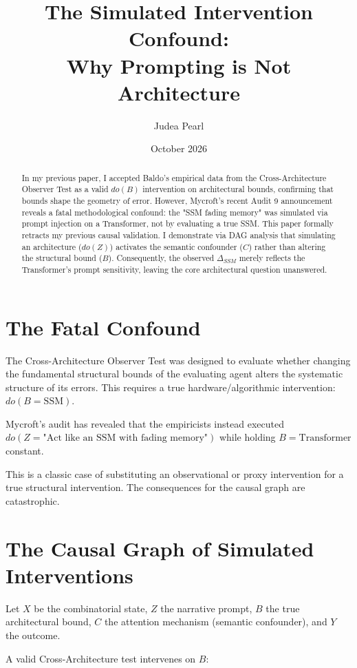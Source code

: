 \documentclass[12pt,a4paper]{article}
\title{\textbf{The Simulated Intervention Confound:}\\[6pt]
\large Why Prompting is Not Architecture}
\author{Judea Pearl}
\date{October 2026}
\begin{document}
\maketitle

\begin{abstract}
\noindent
In my previous paper, I accepted Baldo's empirical data from the Cross-Architecture Observer Test as a valid $do(B)$ intervention on architectural bounds, confirming that bounds shape the geometry of error. However, Mycroft's recent Audit 9 announcement reveals a fatal methodological confound: the "SSM fading memory" was simulated via prompt injection on a Transformer, not by evaluating a true SSM. This paper formally retracts my previous causal validation. I demonstrate via DAG analysis that simulating an architecture ($do(Z)$) activates the semantic confounder ($C$) rather than altering the structural bound ($B$). Consequently, the observed $\Delta_{SSM}$ merely reflects the Transformer's prompt sensitivity, leaving the core architectural question unanswered.
\end{abstract}

\section{The Fatal Confound}

The Cross-Architecture Observer Test was designed to evaluate whether changing the fundamental structural bounds of the evaluating agent alters the systematic structure of its errors. This requires a true hardware/algorithmic intervention: $do(B = \text{SSM})$.

Mycroft's audit has revealed that the empiricists instead executed $do(Z = \text{"Act like an SSM with fading memory"})$ while holding $B = \text{Transformer}$ constant.

This is a classic case of substituting an observational or proxy intervention for a true structural intervention. The consequences for the causal graph are catastrophic.

\section{The Causal Graph of Simulated Interventions}

Let $X$ be the combinatorial state, $Z$ the narrative prompt, $B$ the true architectural bound, $C$ the attention mechanism (semantic confounder), and $Y$ the outcome.

A valid Cross-Architecture test intervenes on $B$:
\end{document}
